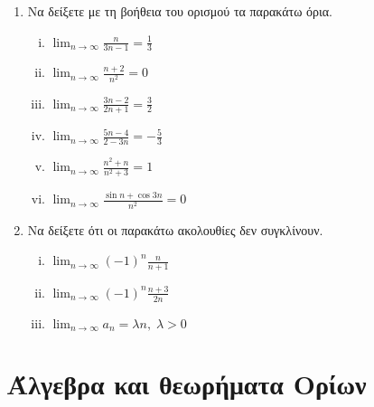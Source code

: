 \begin{enumerate}
    \item Να δείξετε με τη βοήθεια του ορισμού τα παρακάτω όρια.
        \begin{enumerate}[i)]
            \item $ \lim_{n \to \infty} \frac{n}{3n-1} = \frac{1}{3} $
            \item $ \lim_{n \to \infty} \frac{n+2}{n^{2}} = 0 $
            \item $ \lim_{n \to \infty} \frac{3n -2}{2n+1} = \frac{3}{2} $ 
            \item $ \lim_{n \to \infty} \frac{5n-4}{2-3n} = - \frac{5}{3} $ 
            \item $ \lim_{n \to \infty} \frac{n^{2}+n}{n^{2}+3} = 1 $ 
            \item $ \lim_{n \to \infty} \frac{\sin{n} + \cos{3n}}{n^{2}} = 0 $
        \end{enumerate}

    \item Να δείξετε ότι οι παρακάτω ακολουθίες δεν συγκλίνουν.
        \begin{enumerate}[i)]
            \item $ \lim_{n \to \infty} (-1)^{n} \frac{n}{n+1}  $
            \item $ \lim_{n \to \infty} (-1)^{n} \frac{n+3}{2n}  $
            \item $ \lim_{n \to \infty} a_{n} = \lambda n, \; \lambda >0$
        \end{enumerate}
\end{enumerate}

\section{Άλγεβρα και θεωρήματα Ορίων}


